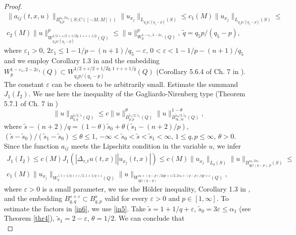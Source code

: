 \documentclass{article}
\theoremstyle{plain}
\begin{document}
\begin{proof}
\begin{multline}
 \|a_{ij}(t,x,u)\|_{B_{q_5 p}^{s_0,2s_0} (S;C([-M,M]))} \|u_{x_j}\|_{L_{q_5p/(q_5-p)}(S)}\leq c_1(M)\|u_{x_j}\|_{L_{q_5p/(q_5-p)}(S)}\leq \\
 c_2(M) \|u\|_{W_{q_5p/(q_5-p)}^{1/2+\varepsilon/2+1/2\tilde{q}, 1+\varepsilon+1/\tilde{q}}(Q)}^p\leq   \|u\|_{W_{p}^{1-\varepsilon_1, 2-2\varepsilon_1}(Q)}^p,\ \tilde{q}=q_5p/(q_5-p),
 \end{multline}
 where $\varepsilon_1>0$,  $2\varepsilon_1\leq 1-1/p -(n+1)/q_5-\varepsilon$, $0<\varepsilon<1-1/p -(n+1)/q_5$ 
 and we employ Corollary 1.3 in \cite{pya11} and the embedding 
 $W_{p}^{1-\varepsilon_1, 2-2\varepsilon_1}(Q)\subset W_{q_5p/(q_5-p)}^{1/2+\varepsilon/2+1/2\tilde{q},1+\varepsilon+1/\tilde{q}}(Q)$ (Corollary  5.6.4 of Ch. 7 in \cite{ama}). The constant $\varepsilon$ can be chosen to be arbitrarily small. 
Estimate the summand 
$J_1(I_2)$. We use here the inequality of the Gagliardo-Nirenberg type  (Theorem  5.7.1 of Ch. 7 in \cite{ama})
\begin{equation}\label{in5}
\|u\|_{B_{q,q}^{\tilde{s}/2,\tilde{s}}(Q)}\leq c\|u\|_{B_{p,p}^{\tilde{s}_1/2,\tilde{s}_1}(Q)}^{\theta} \|u\|_{B_{\infty,\infty}^{\tilde{s}_0/2,\tilde{s}_0}(Q)}^{1-\theta},
\end{equation}
where   $\tilde{s}-(n+2)/q=(1-\theta)\tilde{s}_0+\theta(\tilde{s}_1-(n+2)/p)$, $(\tilde{s}-\tilde{s}_0)/(\tilde{s}_1-\tilde{s}_0)\leq \theta\leq 1$, $-\infty<\tilde{s}_0<\tilde{s}<\tilde{s}_1<\infty$, 
$1\leq q,p\leq \infty$, $\theta>0$. 
 Since  the function  $a_{ij}$ meets  the Lipschitz condition  in the variable $u$, we infer
 \begin{multline}\label{in6}
J_1(I_2)\leq c(M) J_1(|\Delta_{\tau,t}u(t,x)| |u_{x_j}(t,x)|)\leq  c(M)\|u_{x_j}\|_{L_{q}(S)} 
\|u\|_{B_{qp/(q-p),p}^{{s}_0,2{s}_0}(S)}\leq  \\
c_1(M)\|u_{x_j}\|_{W_{q}^{(1+1/q+\varepsilon)/2,1+1/q+\varepsilon}(Q)} 
\|u\|_{W_{qp/(q-p)}^{{s}_0+(q-p)/2qp+\varepsilon/2,2{s}_0+(q-p)/qp+ \varepsilon}(Q)},
\end{multline}
where  $\varepsilon>0$ is a small parameter, we use the H\"{o}lder inequality, Corollary  1.3 in \cite{pya11}, and 
the embedding  $B_{q,q}^{s+\varepsilon}\subset B_{q,p}^s$ valid for every  $\varepsilon>0$ and $p\in [1,\infty]$.
  To estimate the factors in \eqref{in6}, we  use  \eqref{in5}. 
 Take $\tilde{s}=1+1/q+\varepsilon$, $\tilde{s}_0=3\varepsilon\leq \alpha_1$ (see Theorem  \ref{thr4}),
 $\tilde{s}_1=2-\varepsilon$, $\theta=1/2$.  We can conclude that 
  \begin{equation}\label{in7}

\end{equation}
\end{proof}
\end{document}
